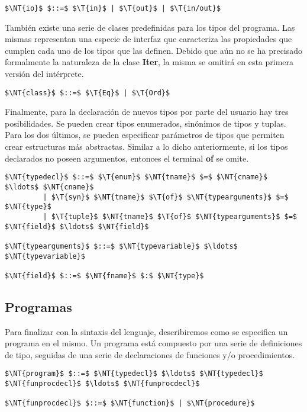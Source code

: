 \begin{lstlisting}[style = syntax]
$\NT{io}$ $::=$ $\T{in}$ | $\T{out}$ | $\T{in/out}$
\end{lstlisting}

También existe una serie de clases predefinidas para los tipos del programa.
Las mismas representan una especie de interfaz que caracteriza las propiedades que cumplen cada uno de los tipos que las definen.
Debido que aún no se ha precisado formalmente la naturaleza de la clase \textbf{Iter}, la misma se omitirá en esta primera versión del intérprete.

\begin{lstlisting}[style = syntax]
$\NT{class}$ $::=$ $\T{Eq}$ | $\T{Ord}$
\end{lstlisting}

Finalmente, para la declaración de nuevos tipos por parte del usuario hay tres posibilidades.
Se pueden crear tipos enumerados, sinónimos de tipos y tuplas.
Para los dos últimos, se pueden especificar parámetros de tipos que permiten crear estructuras más abstractas.
Similar a lo dicho anteriormente, si los tipos declarados no poseen argumentos, entonces el terminal \textbf{of} se omite.

\begin{lstlisting}[style = syntax]
$\NT{typedecl}$ $::=$ $\T{enum}$ $\NT{tname}$ $=$ $\NT{cname}$ $\ldots$ $\NT{cname}$
         | $\T{syn}$ $\NT{tname}$ $\T{of}$ $\NT{typearguments}$ $=$ $\NT{type}$
         | $\T{tuple}$ $\NT{tname}$ $\T{of}$ $\NT{typearguments}$ $=$ $\NT{field}$ $\ldots$ $\NT{field}$

$\NT{typearguments}$ $::=$ $\NT{typevariable}$ $\ldots$ $\NT{typevariable}$

$\NT{field}$ $::=$ $\NT{fname}$ $:$ $\NT{type}$
\end{lstlisting}

\subsection{Programas}

Para finalizar con la sintaxis del lenguaje, describiremos como se especifica un programa en el mismo.
Un programa está compuesto por una serie de definiciones de tipo, seguidas de una serie de declaraciones de funciones y/o procedimientos.

\begin{lstlisting}[style = syntax]
$\NT{program}$ $::=$ $\NT{typedecl}$ $\ldots$ $\NT{typedecl}$ $\NT{funprocdecl}$ $\ldots$ $\NT{funprocdecl}$

$\NT{funprocdecl}$ $::=$ $\NT{function}$ | $\NT{procedure}$
\end{lstlisting}

